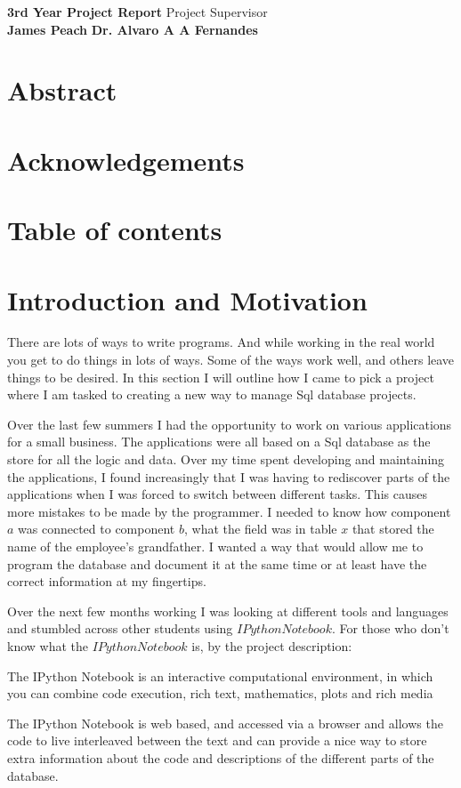 \documentclass[a4paper, 11pt]{article}
\begin{document}
\noindent\large\textbf{3rd Year Project Report} \hfill \normalsize Project Supervisor  \\
\textbf{James Peach}  \hfill
\textbf{Dr. Alvaro A A Fernandes}\hfill

\section*{Abstract}

\section*{Acknowledgements}

\section*{Table of contents}

\section{Introduction and Motivation}

There are lots of ways to write programs. And while working in the real world
you get to do things in lots of ways. Some of the ways work well, and others
leave things to be desired. In this section I will outline how I came  to pick a
project where I am tasked to creating a new way to manage Sql database projects.

Over the last few summers I had the opportunity to work on various applications
for a small business. The applications were all based on a Sql database as the
store for all the logic and data. Over my time spent developing and maintaining
the applications, I found increasingly that I was having to rediscover parts of
the applications when I was forced to switch between different tasks. This
causes more mistakes to be made by the programmer. I needed to know how
component $a$ was connected to component $b$, what the field was in table $x$
that stored the name of the employee's grandfather. I wanted a way that would
allow me to program the database and document it at the same time or at least
have the correct information at my fingertips.

Over the next few months working I was looking at different tools and languages
and stumbled across other students using $IPython Notebook$. For those who don't
know what the $IPython Notebook$ is, by the project description:
\begin{displayquote}
The IPython Notebook is an interactive computational environment, in which
 you can combine code execution, rich text, mathematics, plots and rich media
\end{displayquote}
The IPython Notebook is web based, and accessed via a browser and allows the
code to live interleaved between the text and can provide a nice way to store
extra information about the code and descriptions of the different parts of the
database.
\end{document}
